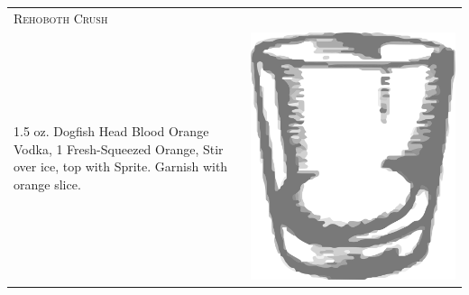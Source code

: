 \documentclass{article}
\begin{document}
\begin{multicols}{2}
\begin{tabular}{p{2in} p{0.5in}}
\multicolumn{2}{p{3in}}{\centering\Huge\textsc{Rehoboth Crush}} \\ 
  \vspace{-0.1in}1.5 oz. Dogfish Head Blood Orange Vodka, 1 Fresh-Squeezed Orange, Stir over ice, top with Sprite. Garnish with orange slice. &
  \vspace{-0.1in} \includegraphics{rocks_glass.png}
\end{tabular}


\end{multicols}
\end{document}
